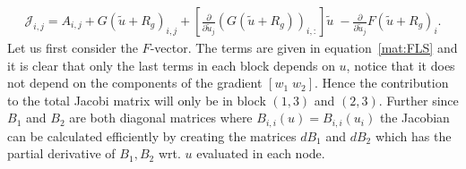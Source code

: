 \begin{align}
	\mathcal{J}_{i,j} = A_{i,j} + G(\tilde{u}+R_g)_{i,j} +  [\frac{\partial}{\partial \tilde{u}_j} (G(\tilde{u}+R_g))_{i,:}] \tilde{u} \; - \frac{\partial}{\partial \tilde{u}_j}F(\tilde{u}+R_g)_i.
\end{align}
%
Let us first consider the $F$-vector. The terms are given in equation~\ref{mat:FLS} and it is clear that only the last terms in each block depends on $u$, notice that it does not depend on the components of the gradient $[ w_1 \; w_2]$. Hence the contribution to the total Jacobi matrix will only be in block $(1,3)$ and $(2,3)$. Further since $B_1$ and $B_2$ are both diagonal matrices where $B_{i,i}(u) = B_{i,i}(u_i)$ the Jacobian can be calculated efficiently by creating the matrices $dB_1$ and $dB_2$ which has the partial derivative of $B_1,B_2$ wrt. $u$ evaluated in each node.   





